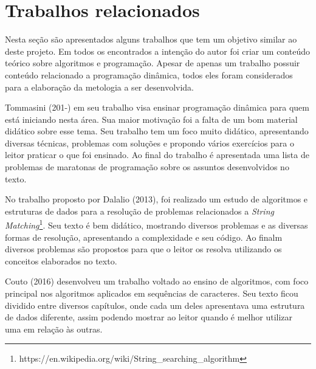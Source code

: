 
\chapter{Trabalhos relacionados}
\label{chap:historico}

Nesta seção são apresentados alguns trabalhos que tem um objetivo similar ao deste projeto. Em todos os encontrados a intenção do autor foi criar um conteúdo teórico sobre algoritmos e programação. Apesar de apenas um trabalho possuir conteúdo relacionado a programação dinâmica, todos eles foram considerados para a elaboração da metologia a ser desenvolvida.

Tommasini (201-) em seu trabalho visa ensinar programação dinâmica para quem está iniciando nesta área. Sua maior motivação foi a falta de um bom material didático sobre esse tema. Seu trabalho tem um foco muito didático, apresentando diversas técnicas, problemas com soluções e propondo vários exercícios para o leitor praticar o que foi ensinado. Ao final do trabalho é apresentada uma lista de problemas de maratonas de programação sobre os assuntos desenvolvidos no texto.


No trabalho proposto por Dalalio (2013), foi realizado um estudo de algoritmos e estruturas de dados para a resolução de problemas relacionados a \textit{String Matching}\footnote{https://en.wikipedia.org/wiki/String\_searching\_algorithm}. Seu texto é bem didático, mostrando diversos problemas e as diversas formas de resolução, apresentando a complexidade e seu código. Ao finalm diversos problemas são propostos para que o leitor os resolva utilizando os conceitos elaborados no texto.


Couto (2016) desenvolveu um trabalho voltado ao ensino de algoritmos, com foco principal nos algoritmos aplicados em sequências de caracteres. Seu texto ficou dividido entre diversos capítulos, onde cada um deles apresentava uma estrutura de dados diferente, assim podendo mostrar ao leitor quando é melhor utilizar uma em relação às outras.






